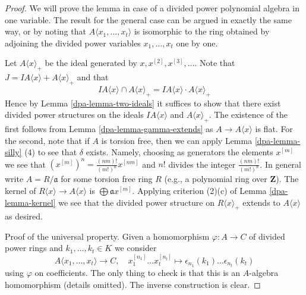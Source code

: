 \begin{proof}

We will prove the lemma in case of a divided power polynomial algebra
in one variable. The result for the general case can be argued in exactly
the same way, or by noting that $A\langle x_1, \ldots, x_t\rangle$ is
isomorphic to the ring obtained by adjoining the divided power variables
$x_1, \ldots, x_t$ one by one.

\medskip\noindent
Let $A\langle x \rangle_{+}$ be the ideal generated by
$x, x^{[2]}, x^{[3]}, \ldots$.
Note that $J = IA\langle x \rangle + A\langle x \rangle_{+}$
and that
$$
IA\langle x \rangle \cap A\langle x \rangle_{+} =
IA\langle x \rangle \cdot A\langle x \rangle_{+}
$$
Hence by Lemma \ref{dpa-lemma-two-ideals} it suffices to show that there
exist divided power structures on the ideals $IA\langle x \rangle$ and
$A\langle x \rangle_{+}$. The existence of the first follows from
Lemma \ref{dpa-lemma-gamma-extends} as $A \to A\langle x \rangle$ is flat.
For the second, note that if $A$ is torsion free, then we can apply
Lemma \ref{dpa-lemma-silly} (4) to see that $\delta$ exists. Namely, choosing
as generators the elements $x^{[m]}$ we see that
$(x^{[m]})^n = \frac{(nm)!}{(m!)^n} x^{[nm]}$
and $n!$ divides the integer $\frac{(nm)!}{(m!)^n}$.
In general write $A = R/\mathfrak a$ for some torsion free ring $R$
(e.g., a polynomial ring over $\mathbf{Z}$). The kernel of
$R\langle x \rangle \to A\langle x \rangle$ is
$\bigoplus \mathfrak a x^{[m]}$. Applying criterion (2)(c) of
Lemma \ref{dpa-lemma-kernel} we see that the divided power structure
on $R\langle x \rangle_{+}$ extends to $A\langle x \rangle$ as
desired.

\medskip\noindent
Proof of the universal property. Given a homomorphism $\varphi : A \to C$
of divided power rings and $k_1, \ldots, k_t \in K$ we consider
$$
A\langle x_1, \ldots, x_t \rangle \to C,\quad
x_1^{[n_1]} \ldots x_t^{[n_t]} \longmapsto
\epsilon_{n_1}(k_1) \ldots \epsilon_{n_t}(k_t)
$$
using $\varphi$ on coefficients. The only thing to check is that
this is an $A$-algebra homomorphism (details omitted). The inverse
construction is clear.
\end{proof}

